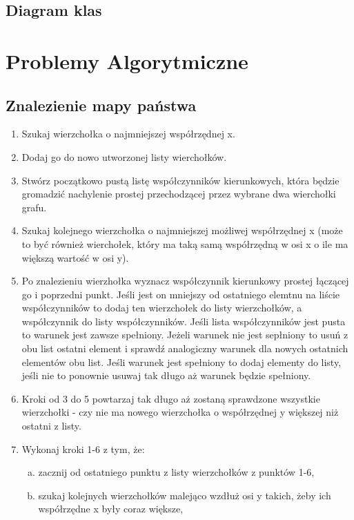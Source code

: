 \documentclass[10pt,a4paper]{article}
\begin{document}
\subsection{Diagram klas}

\section{Problemy Algorytmiczne}

\subsection{Znalezienie mapy państwa}

\begin{enumerate}
    \item Szukaj wierzchołka o najmniejszej współrzędnej x.
    \item Dodaj go do nowo utworzonej listy wierchołków.
    \item Stwórz początkowo pustą listę współczynników kierunkowych, która będzie gromadzić nachylenie prostej przechodzącej przez wybrane dwa wierchołki grafu.
    \item Szukaj kolejnego wierzchołka o najmniejszej możliwej współrzędnej x (może to być również wierchołek, który ma taką samą współrzędną w osi x o ile ma większą wartość w osi y).
    \item Po znalezieniu wierzhołka wyznacz współczynnik kierunkowy prostej łączącej go i poprzedni punkt. Jeśli jest on mniejszy od ostatniego elemtnu na liście współczynników to dodaj ten wierzchołek do listy wierzchołków, a współczynnik do listy współczynników. Jeśli lista współczynników jest pusta to warunek jest zawsze spełniony. Jeżeli warunek nie jest sepłniony to usuń z obu list ostatni element i sprawdź analogiczny warunek dla nowych ostatnich elementów obu list. Jeśli warunek jest spełniony to dodaj elementy do listy, jeśli nie to ponownie usuwaj tak długo aż warunek będzie spełniony.
    \item Kroki od 3 do 5 powtarzaj tak długo aż zostaną sprawdzone wszystkie wierzchołki - czy nie ma nowego wierzchołka o współrzędnej y większej niż ostatni z listy.
    \item Wykonaj kroki 1-6 z tym, że:
    \begin{enumerate}[a)]
        \item zacznij od ostatniego punktu z listy wierzchołków z punktów 1-6,
        \item szukaj kolejnych wierzchołków malejąco wzdłuż osi y takich, żeby ich współrzędne x były coraz większe,

\end{enumerate}
\end{enumerate}
\end{document}
